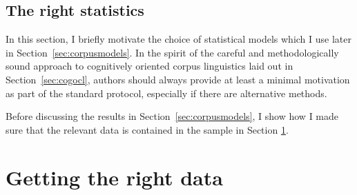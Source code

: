 \documentclass[USenglish]{article}
\begin{document}

\subsection{The right statistics}
\label{ssec:rightstatistics}

In this section, I briefly motivate the choice of statistical models which I use later in Section~\ref{sec:corpusmodels}.
In the spirit of the careful and methodologically sound approach to cognitively oriented corpus linguistics laid out in Section~\ref{sec:cogocl}, authors should always provide at least a minimal motivation as part of the standard protocol, especially if there are alternative methods.





Before discussing the results in Section~\ref{sec:corpusmodels}, I show how I made sure that the relevant data is contained in the sample in Section \ref{sec:gettingdata}.

\section{Getting the right data}
\label{sec:gettingdata}
\end{document}
